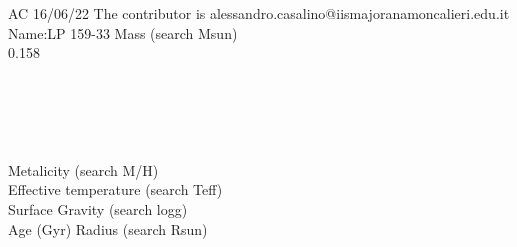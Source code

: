 AC 16/06/22
The contributor is alessandro.casalino@iismajoranamoncalieri.edu.it\\
Name:LP 159-33 
Mass (search Msun)\\
0.158\url{}\\
\url{}\\
\url{}\\
\url{}\\
\url{}\\
\url{}\\
Metalicity (search M/H)\\

Effective temperature (search Teff) \\
Surface Gravity (search logg) \\
Age (Gyr)
Radius (search Rsun)



